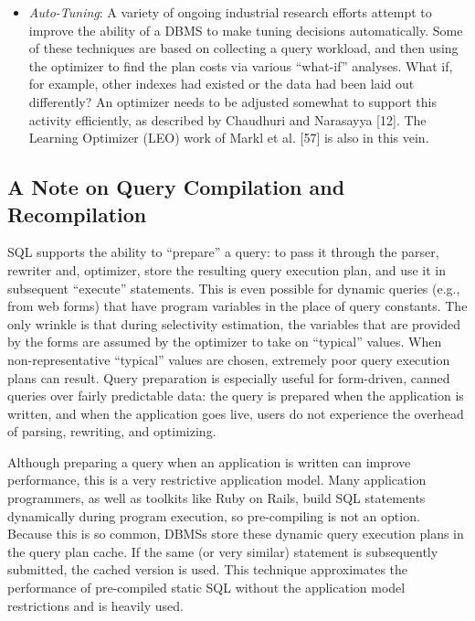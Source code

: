 \documentclass[b5paper,11pt,twoside,openright]{book}
\begin{document}
\begin{itemize}
\item
  \emph{Auto-Tuning}: A variety of ongoing industrial research efforts
  attempt to improve the ability of a DBMS to make tuning decisions
  automatically. Some of these techniques are based on collecting a
  query workload, and then using the optimizer to find the plan costs
  via various ``what-if'' analyses. What if, for example, other indexes
  had existed or the data had been laid out differently? An optimizer
  needs to be adjusted somewhat to support this activity efficiently, as
  described by Chaudhuri and Narasayya {[}12{]}. The Learning Optimizer
  (LEO) work of Markl et al. {[}57{]} is also in this vein.
\end{itemize}

\hypertarget{a-note-on-query-compilation-and-recompilation}{%
\subsection{A Note on Query Compilation and
Recompilation}\label{a-note-on-query-compilation-and-recompilation}}

SQL supports the ability to ``prepare'' a query: to pass it through the
parser, rewriter and, optimizer, store the resulting query execution
plan, and use it in subsequent ``execute'' statements. This is even
possible for dynamic queries (e.g., from web forms) that have program
variables in the place of query constants. The only wrinkle is that
during selectivity estimation, the variables that are provided by the
forms are assumed by the optimizer to take on ``typical'' values. When
non-representative ``typical'' values are chosen, extremely poor query
execution plans can result. Query preparation is especially useful for
form-driven, canned queries over fairly predictable data: the query is
prepared when the application is written, and when the application goes
live, users do not experience the overhead of parsing, rewriting, and
optimizing.

Although preparing a query when an application is written can improve
performance, this is a very restrictive application model. Many
application programmers, as well as toolkits like Ruby on Rails, build
SQL statements dynamically during program execution, so pre-compiling is
not an option. Because this is so common, DBMSs store these dynamic
query execution plans in the query plan cache. If the same (or very
similar) statement is subsequently submitted, the cached version is
used. This technique approximates the performance of pre-compiled static
SQL without the application model restrictions and is heavily used.
\end{document}
